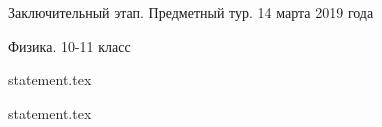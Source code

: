 \documentclass[a4paper,11pt, oneside]{book}
\begin{document}
\vspace{-3mm}
\vspace{-5mm}

\normalsize

\begin{center}
    Заключительный этап. Предметный тур. 14 марта 2019 года
    
    Физика. 10-11 класс
\end{center}

\parindent=0cm

%

{statement.tex}

\newpage

{statement.tex}
\end{document}
